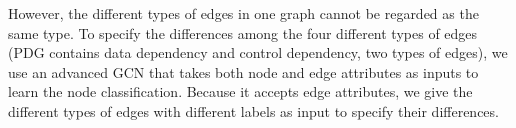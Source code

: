 However, the different types of edges in one graph cannot be regarded as the same type. To specify the differences among the four different types of edges (PDG contains data dependency and control dependency, two types of edges), we use an advanced GCN \cite{li2019gcn} that takes both node and edge attributes as inputs to learn the node classification. Because it accepts edge attributes, we give the different types of edges with different labels as input to specify their differences.






